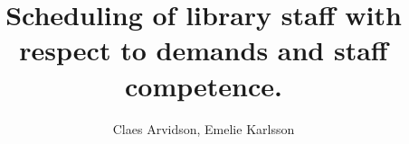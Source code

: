 \documentclass[a4paper, 10pt, twoside, openright]{book}
\newcommand{\putauthor}[0]{Claes Arvidson, Emelie Karlsson}
\newcommand{\puttitle}[0]{Scheduling of library staff with respect to demands and staff competence.}
\begin{document}
 

\frontmatter

\newcommand{\ala}[0]{{\alpha}_{1}}
\newcommand{\alb}[0]{{\alpha}_{2}}
\newcommand{\nc}[0]{{N}_{C}}
\newcommand{\tCh}[0]{the Chemostat }
\newcommand{\Ch}[0]{Chemostat }
\newcommand{\ch}[0]{chemostat }
\newcommand{\MMk}[0]{Michaelis-Menten kinetics }
\newcommand{\KI}[0]{{K}_{I} }
\newcommand{\KN}[0]{{K}_{N} }
\newcommand{\mmu}[0]{{\mu}_{max} }
\newcommand{\KMAX}[0]{\mmu}
\newcommand{\AAA}[0]{\mathbf{A} }
\newcommand{\enc}[0]{utf8}

\title{\puttitle}
\author{\putauthor}

\end{document}
